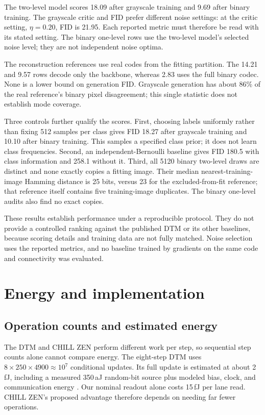 \documentclass[reprint,amsmath,amssymb,aps,pra,floatfix,nofootinbib]{revtex4-2}
\newcommand{\noise}{\eta}
\begin{document}
The two-level model scores 18.09 after grayscale training and 9.69 after binary training. The grayscale critic and FID prefer different noise settings: at the critic setting, $\noise=0.20$, FID is 21.95. Each reported metric must therefore be read with its stated setting. The binary one-level rows use the two-level model's selected noise level; they are not independent noise optima.

The reconstruction references use real codes from the fitting partition. The 14.21 and 9.57 rows decode only the backbone, whereas 2.83 uses the full binary codec. None is a lower bound on generation FID. Grayscale generation has about 86\% of the real reference's binary pixel disagreement; this single statistic does not establish mode coverage.

Three controls further qualify the scores. First, choosing labels uniformly rather than fixing 512 samples per class gives FID 18.27 after grayscale training and 10.10 after binary training. This samples a specified class prior; it does not learn class frequencies. Second, an independent-Bernoulli baseline gives FID 180.5 with class information and 258.1 without it. Third, all 5120 binary two-level draws are distinct and none exactly copies a fitting image. Their median nearest-training-image Hamming distance is 25 bits, versus 23 for the excluded-from-fit reference; that reference itself contains five training-image duplicates. The binary one-level audits also find no exact copies.

These results establish performance under a reproducible protocol. They do not provide a controlled ranking against the published DTM or its other baselines, because scoring details and training data are not fully matched. Noise selection uses the reported metrics, and no baseline trained by gradients on the same code and connectivity was evaluated.

\section{Energy and implementation}\label{sec:energy}
\subsection{Operation counts and estimated energy}
The DTM and CHILL ZEN perform different work per step, so sequential step counts alone cannot compare energy. The eight-step DTM uses $8\times250\times4900\approx10^7$ conditional updates. Its full update is estimated at about 2\,fJ, including a measured 350\,aJ random-bit source plus modeled bias, clock, and communication energy \cite{jelincic2025dtm}. Our nominal readout alone costs 15\,fJ per lane read. CHILL ZEN's proposed advantage therefore depends on needing far fewer operations.
\end{document}
